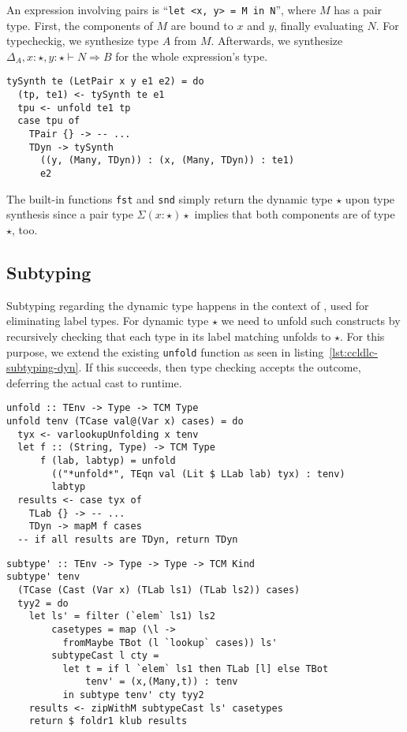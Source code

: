 An expression involving pairs is ``\lstinline[language=ldgv]!let <x, y> = M in N!'', where $M$ has a pair type. First, the components of $M$ are bound to $x$ and $y$, finally evaluating $N$. For typecheckig, we synthesize type $A$ from $M$. Afterwards, we synthesize $\Delta_A, x:\star, y:\star \vdash N \Rightarrow B$ for the whole expression's type.

\begin{lstlisting}[caption=Pair type synthesis (\texttt{TCTyping.hs})]
tySynth te (LetPair x y e1 e2) = do
  (tp, te1) <- tySynth te e1
  tpu <- unfold te1 tp
  case tpu of
    TPair {} -> -- ...
    TDyn -> tySynth
      ((y, (Many, TDyn)) : (x, (Many, TDyn)) : te1)
      e2
\end{lstlisting}

The built-in functions \texttt{fst} and \texttt{snd} simply return the dynamic type $\star$ upon type synthesis since a pair type $\Sigma(x:\star)\star$ implies that both components are of type $\star$, too.

\subsection{Subtyping}

Subtyping regarding the dynamic type happens in the context of \case, used for eliminating label types. For dynamic type $\star$ we need to unfold such \case constructs by recursively checking that each type in its label matching unfolds to $\star$. For this purpose, we extend the existing \texttt{unfold} function as seen in listing~\ref{lst:ccldlc-subtyping-dyn}. If this succeeds, then type checking accepts the outcome, deferring the actual cast to runtime.

\begin{lstlisting}[float,
	caption=Unfolding to $\star$ in case terms (\texttt{TCSubtyping.hs}),
	label=lst:ccldlc-subtyping-dyn]
unfold :: TEnv -> Type -> TCM Type
unfold tenv (TCase val@(Var x) cases) = do
  tyx <- varlookupUnfolding x tenv
  let f :: (String, Type) -> TCM Type
      f (lab, labtyp) = unfold
        (("*unfold*", TEqn val (Lit $ LLab lab) tyx) : tenv)
        labtyp
  results <- case tyx of
    TLab {} -> -- ...
    TDyn -> mapM f cases
  -- if all results are TDyn, return TDyn
\end{lstlisting}

\begin{lstlisting}[float,
	caption=Subtyping for casts in case terms (\texttt{TCSubtyping.hs}),
	label=lst:ccldgv-cast-subtyping]
subtype' :: TEnv -> Type -> Type -> TCM Kind
subtype' tenv
  (TCase (Cast (Var x) (TLab ls1) (TLab ls2)) cases)
  tyy2 = do
    let ls' = filter (`elem` ls1) ls2
        casetypes = map (\l ->
          fromMaybe TBot (l `lookup` cases)) ls'
        subtypeCast l cty =
          let t = if l `elem` ls1 then TLab [l] else TBot
              tenv' = (x,(Many,t)) : tenv
          in subtype tenv' cty tyy2
    results <- zipWithM subtypeCast ls' casetypes
    return $ foldr1 klub results
\end{lstlisting}

